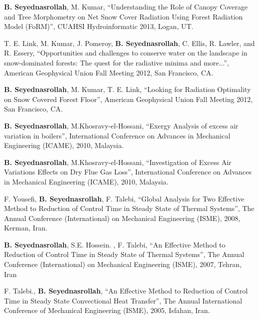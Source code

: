 \documentclass[10pt]{article}
\newenvironment{changemargin}[2]{%
  \begin{list}{}{%
    \setlength{\topsep}{0pt}%
    \setlength{\leftmargin}{#1}%
    \setlength{\rightmargin}{#2}%
    \setlength{\listparindent}{\parindent}%
    \setlength{\itemindent}{\parindent}%
    \setlength{\parsep}{\parskip}%
  }%
  \item[]}{\end{list}
}
\newenvironment{body} {
	\vspace*{-2pt}
	\begin{changemargin}{-0.5in}{-0.5in}
  }
	{\end{changemargin}
}
\begin{document}
\begin{body}
   \textbf{B. Seyednasrollah}, M. Kumar, ``Understanding the Role of Canopy Coverage and Tree Morphometry on Net Snow Cover Radiation Using Forest Radiation Model (FoRM)'', CUAHSI Hydroinformatic 2013, Logan, UT.\\
\medskip

   T. E. Link, M. Kumar, J. Pomeroy, \textbf{B. Seyednasrollah}, C. Ellis, R. Lawler, and R. Essery, ``Opportunities and challenges to conserve water on the landscape in snow-dominated forests: The quest for the radiative minima and more...'', American Geophysical Union Fall Meeting 2012, San Francisco, CA.\\
\medskip

   \textbf{B. Seyednasrollah}, M. Kumar, T. E. Link, ``Looking for Radiation Optimality on Snow Covered Forest Floor'', American Geophysical Union Fall Meeting 2012, San Francisco, CA.\\
\medskip

   \textbf{B. Seyednasrollah}, M.Khosravy-el-Hossani, ``Exergy Analysis of excess air variation in boilers'', International Conference on Advances in Mechanical Engineering (ICAME), 2010, Malaysia.\\
\medskip

   \textbf{B. Seyednasrollah}, M.Khosravy-el-Hossani, ``Investigation of Excess Air Variations Effects on Dry Flue Gas Loss'', International Conference on Advances in Mechanical Engineering (ICAME), 2010, Malaysia.\\
\medskip


   F. Yousefi, \textbf{B. Seyednasrollah}, F. Talebi, ``Global Analysis for Two Effective Method to Reduction of Control Time in Steady State of Thermal Systems'', The Annual Conference (International) on Mechanical Engineering (ISME), 2008, Kerman, Iran. \\
\medskip

   \textbf{B. Seyednasrollah}, S.E. Hossein. , F. Talebi, ``An Effective Method to Reduction of Control Time in Steady State of Thermal Systems'', The Annual Conference (International) on Mechanical Engineering (ISME), 2007, Tehran, Iran\\
\medskip

   F. Talebi., \textbf{B. Seyednasrollah}, ``An Effective Method to Reduction of Control Time in Steady State Convectional Heat Transfer'', The Annual International Conference of Mechanical Engineering (ISME), 2005, Isfahan, Iran.\\
\medskip


\end{body}
\medskip
\end{document}
